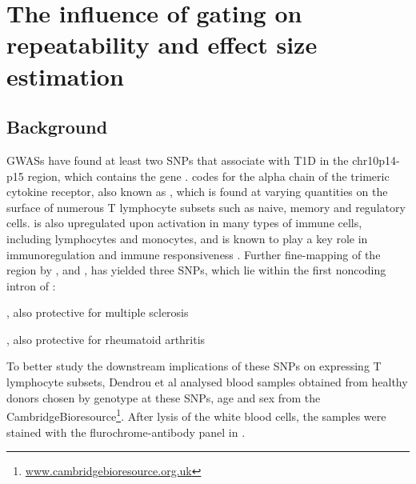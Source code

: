 \chapter{ \label{chapter:il2ra} The influence of gating on repeatability and effect size estimation }

\section{Background}

\Glspl{GWAS} have found at least two \glspl{SNP} that associate with T1D in the chr10p14-p15 region, which contains the  gene \citep{Lowe:2007ij}.
 codes for the alpha chain of the trimeric  cytokine receptor, also known as ,  
which is found at varying quantities on the surface of numerous T lymphocyte subsets such as naive, memory and
regulatory cells.
 is also upregulated upon activation in many types of immune cells, including lymphocytes and monocytes, 
and is known to play a key role in immunoregulation and immune responsiveness \citep{Brusko:2009bn,Boyman:2012cy}.
Further fine-mapping of the  region by \citet{Lowe:2007ij}, \citet{Smyth:2008kx} and \citet{Maier:2009hh}, has yielded three SNPs, which lie within
the first noncoding intron of :
\begin{itemise}
  \item {}  
  \item {}, also protective for multiple sclerosis \citep{Beecham:2013hh}
  \item {}, also protective for rheumatoid arthritis \citep{Stahl:2010dy}
\end{itemise}


To better study the downstream implications of these SNPs on  expressing T lymphocyte subsets,
Dendrou et al
analysed blood samples obtained from healthy donors chosen by genotype at these SNPs, age and sex from the CambridgeBioresource\footnote{\url{www.cambridgebioresource.org.uk}}.
After lysis of the white blood cells, the samples were stained with the flurochrome-antibody panel in .


